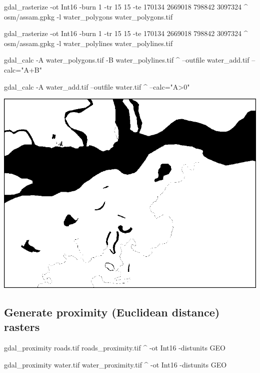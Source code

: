 \documentclass[12pt,a4paper]{article}
\newenvironment{Shaded}{\begin{snugshade}}{\end{snugshade}}
\newcommand{\ExtensionTok}[1]{#1}
\newcommand{\NormalTok}[1]{#1}
\newcommand{\StringTok}[1]{\textcolor[rgb]{0.31,0.60,0.02}{#1}}
\begin{document}
\begin{Shaded}
\begin{Highlighting}[]
\ExtensionTok{gdal_rasterize}\NormalTok{ -ot Int16 -burn 1 -tr 15 15 -te 170134 2669018 798842 3097324 ^}
  \ExtensionTok{osm/assam.gpkg}\NormalTok{ -l water_polygons water_polygons.tif}

\ExtensionTok{gdal_rasterize}\NormalTok{ -ot Int16 -burn 1 -tr 15 15 -te 170134 2669018 798842 3097324 ^}
  \ExtensionTok{osm/assam.gpkg}\NormalTok{ -l water_polylines water_polylines.tif}


\ExtensionTok{gdal_calc}\NormalTok{ -A water_polygons.tif -B water_polylines.tif ^}
  \ExtensionTok{--outfile}\NormalTok{ water_add.tif --calc=}\StringTok{"A+B"}

\ExtensionTok{gdal_calc}\NormalTok{ -A water_add.tif --outfile water.tif ^}
  \ExtensionTok{--calc}\NormalTok{=}\StringTok{"A>0"}
\end{Highlighting}
\end{Shaded}

\begin{center}\includegraphics{images/gdal/water_raster} \end{center}

\hypertarget{generate-proximity-euclidean-distance-rasters}{%
\subsection{Generate proximity (Euclidean distance)
rasters}\label{generate-proximity-euclidean-distance-rasters}}

\begin{Shaded}
\begin{Highlighting}[]
\ExtensionTok{gdal_proximity}\NormalTok{ roads.tif roads_proximity.tif ^}
  \ExtensionTok{-ot}\NormalTok{ Int16 -distunits GEO}

\ExtensionTok{gdal_proximity}\NormalTok{ water.tif water_proximity.tif ^}
  \ExtensionTok{-ot}\NormalTok{ Int16 -distunits GEO}
\end{Highlighting}
\end{Shaded}
\end{document}
